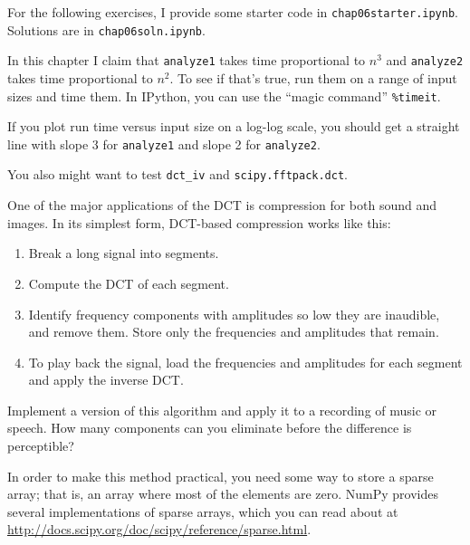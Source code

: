 \documentclass[12pt]{book}
\begin{document}
For the following exercises, I provide some starter code in
{\tt chap06starter.ipynb}.
Solutions are in {\tt chap06soln.ipynb}.

\begin{exercise}
In this chapter I claim that {\tt analyze1} takes time proportional
to $n^3$ and {\tt analyze2} takes time proportional to $n^2$.  To
see if that's true, run them on a range of input sizes and time
them.  In IPython, you can use the ``magic command'' \verb"%timeit".

If you plot run time versus input size on a log-log scale, you
should get a straight line with slope 3 for  {\tt analyze1} and
slope 2 for {\tt analyze2}.

You also might want to test \verb"dct_iv"
and {\tt scipy.fftpack.dct}.

\end{exercise}


\begin{exercise}
One of the major applications of the DCT is compression for both
sound and images.  In its simplest form, DCT-based compression
works like this:

\begin{enumerate}

\item Break a long signal into segments.

\item Compute the DCT of each segment.

\item Identify frequency components with amplitudes so low they are
  inaudible, and remove them.  Store only the frequencies and
  amplitudes that remain.

\item To play back the signal, load the frequencies and amplitudes
  for each segment and apply the inverse DCT.

\end{enumerate}

Implement a version of this algorithm and apply it to a recording
of music or speech.  How many components can you eliminate before
the difference is perceptible?

In order to make this method practical, you need some way to store a
sparse array; that is, an array where most of the elements are zero.
NumPy provides several implementations of sparse arrays, which you can
read about at
\url{http://docs.scipy.org/doc/scipy/reference/sparse.html}.
\end{exercise}
\end{document}

